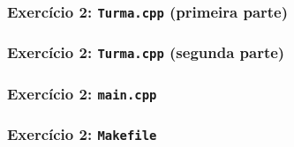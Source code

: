 \documentclass[aspectratio=169]{beamer}
\begin{document}
\begin{frame}[fragile]\frametitle{Exercício 2: \texttt{Turma.cpp} (primeira parte)}
\fontsize{6pt}{6pt}\selectfont{

}
\end{frame}

\begin{frame}[fragile]\frametitle{Exercício 2: \texttt{Turma.cpp} (segunda parte)}
\fontsize{6pt}{6pt}\selectfont{

}
\end{frame}

\begin{frame}[fragile]\frametitle{Exercício 2: \texttt{main.cpp}}
\fontsize{6pt}{6pt}\selectfont{

}
\end{frame}

\begin{frame}[fragile]\frametitle{Exercício 2: \texttt{Makefile}}

\end{frame}


\end{document}
